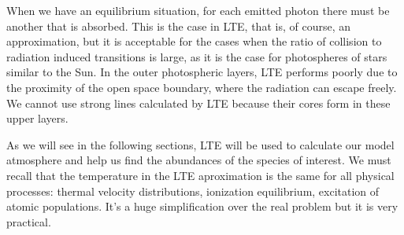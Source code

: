 \documentclass[dvips,12pt,a4paper]{report}
\begin{document}
{When we have an equilibrium situation, for each emitted photon there must be another that is absorbed.%
This is the case in LTE, that is, of course, an approximation, but it is acceptable for the cases when the ratio of collision to radiation induced transitions is large, as it is the case for photospheres of stars similar to the Sun. In the outer photospheric layers, LTE performs poorly due to the proximity of the open space boundary, where the radiation can escape freely. %
We cannot use strong lines calculated by LTE because their cores form in these upper layers.

As we will see in the following sections, LTE will be used to calculate our model atmosphere and help us find the abundances of the species of interest. We must recall that the temperature in the LTE aproximation is the same for all physical processes: thermal velocity distributions, ionization equilibrium, excitation of atomic populations. It's a huge simplification over the real problem but it is very practical.












}
\end{document}
